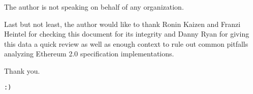 \documentclass[twoside,twocolumn]{article}
\begin{document}
The author is not speaking on behalf of any organization.\par

Last but not least, the author would like to thank Ronin Kaizen and Franzi Heintel for checking this document for its integrity and Danny Ryan for giving this data a quick review as well as enough context to rule out common pitfalls analyzing Ethereum 2.0 specification implementations.\par

Thank you.\par

\texttt{:)}
\end{document}
